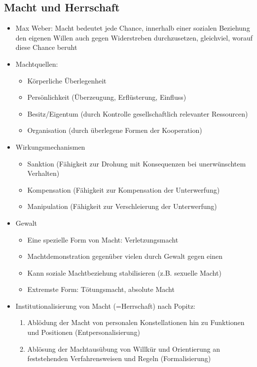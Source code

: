 \documentclass{scrartcl}
\begin{document}
\subsection*{Macht und Herrschaft}
\begin{itemize}
    \item
	Max Weber: Macht bedeutet jede Chance, innerhalb einer sozialen Beziehung den eigenen Willen auch gegen Widerstreben durchzusetzen, gleichviel, worauf diese Chance beruht	
    \item
	Machtquellen:
	\begin{itemize}
	    \item
		Körperliche Überlegenheit
	    \item
		Persönlichkeit (Überzeugung, Erflüsterung, Einfluss)
	    \item
		Besitz/Eigentum (durch Kontrolle gesellschaftlich relevanter Ressourcen)
	    \item
		Organisation (durch überlegene Formen der Kooperation)
	\end{itemize}
    \item
	Wirkungsmechanismen
	\begin{itemize}
	    \item
		Sanktion (Fähigkeit zur Drohung mit Konsequenzen bei unerwünschtem Verhalten)
	    \item
		Kompensation (Fähigkeit zur Kompensation der Unterwerfung)
	    \item
		Manipulation (Fähigkeit zur Verschleierung der Unterwerfung)
	\end{itemize}
    \item
	Gewalt
	\begin{itemize}
	    \item
		Eine spezielle Form von Macht: Verletzungsmacht
	    \item
		Machtdemonstration gegenüber vielen durch Gewalt gegen einen
	    \item
		Kann soziale Machtbeziehung stabilisieren (z.B. sexuelle Macht)
	    \item
		Extremste Form: Tötungsmacht, absolute Macht
	\end{itemize}
    \item
	Institutionalisierung von Macht (=Herrschaft) nach Popitz:
	\begin{enumerate}
	    \item
		Ablödung der Macht von personalen Konstellationen hin zu Funktionen und Positionen (Entpersonalisierung)	
	    \item
		Ablösung der Machtausübung von Willkür und Orientierung an feststehenden Verfahrensweisen und Regeln (Formalisierung)

\end{enumerate}
\end{itemize}
\end{document}
